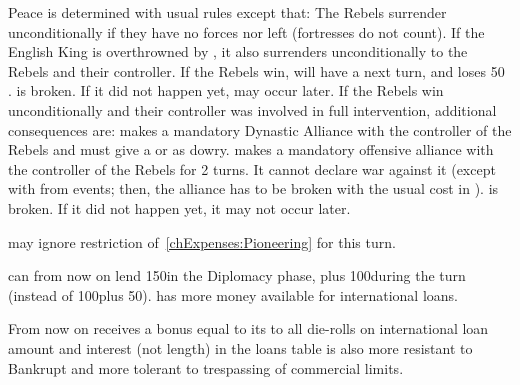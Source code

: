 \phpaix
\aparag Peace is determined with usual rules except that:
\bparag The Rebels surrender unconditionally if they have no forces nor
\REVOLT left (fortresses do not count).
\bparag If the English King is overthrowned by \REVOLT, it also surrenders
unconditionally to the Rebels and their controller.
\aparag If the Rebels win, \ENG will have a  next turn,
and loses 50 \PV.
\bparag {} is broken. If it did not happen yet, may
occur later.
\aparag If the Rebels win unconditionally and their controller was involved in
full intervention, additional consequences are:
\bparag \ENG makes a mandatory Dynastic Alliance with the controller of the
Rebels and must give a \COL or \TP as dowry.
\bparag \ENG makes a mandatory offensive alliance with the controller of the
Rebels for 2 turns. It cannot declare war against it (except with \CB from
events; then, the alliance has to be broken with the usual cost in \STAB).
\bparag {} is broken. If it did not happen yet, it may
not occur later.






\phadm
\aparag \ENG may ignore restriction of~\ref{chExpenses:Pioneering} for this
turn.

\effetlong
\aparag \ENG can from now on lend 150\ducats in the Diplomacy phase, plus
100\ducats during the turn (instead of 100\ducats plus 50\ducats).
\aparag \ENG has more money available for international loans.
\begin{oldcompta}
  \aparag From now on \ENG receives a bonus equal to its \DTI to all die-rolls
  on international loan amount and interest (not length) in the loans table
  \aparag \ENG is also more resistant to Bankrupt and more tolerant to
  trespassing of commercial limits.
\end{oldcompta}





